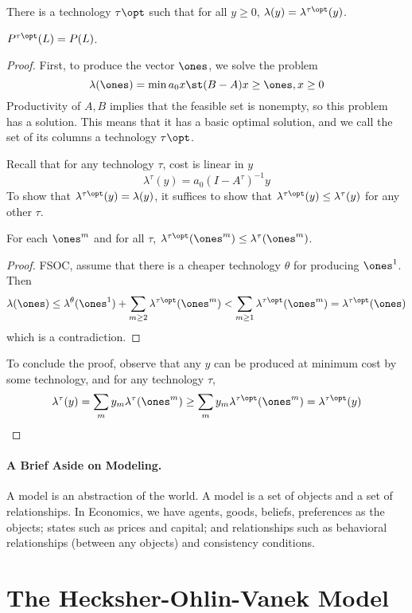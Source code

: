\documentclass[10pt]{article}
\begin{document}
\begin{theorem}
	 There is a technology $\tau\opt$ such that for all $y \ge 0$, $\lambda(y) = \lambda^{\tau\opt}(y)$.
\end{theorem}
\begin{corollary}
	$P^{\tau\opt}(L) = P(L)$.
\end{corollary}
\begin{proof}
	First, to produce the vector $\ones$, we solve the problem \[\lambda(\ones) = \min a_0 x \st (B-A)x \ge \ones, x \ge 0\]Productivity of $A,B$ implies that the feasible set is nonempty, so this problem has a solution. This means that it has a basic optimal solution, and we call the set of its columns a technology $\tau\opt$. 
	
	Recall that for any technology $\tau$, cost is linear in $y$\[\lambda^\tau (y) = a_0 (I - A^\tau)^{-1}y\]To show that $\lambda^{\tau\opt}(y) = \lambda(y)$, it suffices to show that $\lambda^{\tau\opt}(y) \le \lambda^\tau(y)$ for any other $\tau$. 
	\begin{lemma}
		For each $\ones^m$ and for all $\tau$, $\lambda^{\tau\opt}(\ones^m) \le \lambda^\tau(\ones^m)$.
	\end{lemma}
	\begin{proof} FSOC, assume that there is a cheaper technology $\theta$ for producing $\ones^1$. Then \[\lambda(\ones) \le \lambda^\theta (\ones^1) + \sum_{m \ge 2} \lambda^{\tau\opt} (\ones^m) < \sum_{m \ge 1} \lambda^{\tau\opt} (\ones^m) = \lambda^{\tau\opt} (\ones)\]which is a contradiction. \end{proof}
	
	To conclude the proof, observe that any $y$ can be produced at minimum cost by some technology, and for any technology $\tau$, \[\lambda^\tau(y) = \sum_m y_m \lambda^\tau (\ones^m) \ge \sum_m y_m \lambda^{\tau\opt} (\ones^m) = \lambda^{\tau\opt}(y)\]
\end{proof}

\paragraph{A Brief Aside on Modeling.} A model is an abstraction of the world. A model is a set of objects and a set of relationships. In Economics, we have agents, goods, beliefs, preferences as the objects; states such as prices and capital; and relationships such as behavioral relationships (between any objects) and consistency conditions. 

\section{The Hecksher-Ohlin-Vanek Model}
\end{document}

